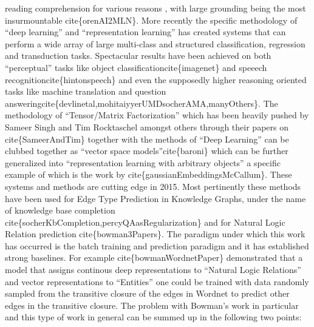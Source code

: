 \documentclass[12pt,answers]{exam} %
\renewcommand{\cite}[1]{cite\{#1\}}
\begin{document}
\begin{questions}
{    reading comprehension for various reasons , with large grounding
    being the most insurmountable \cite{orenAI2MLN}. More recently the
    specific methodology of ``deep learning'' and ``representation
    learning'' has created systems that can perform a wide array of
    large multi-class and structured classification, regression and
    transduction tasks. Spectacular results have been achieved on both
    ``perceptual'' tasks like object classification\cite{imagenet} and
    speeech recognition\cite{hintonspeech} and even the supposedly
    higher reasoning oriented tasks like machine translation and
    question
    answering\cite{devlinetal,mohitaiyyerUMDsocherAMA,manyOthers}. The
    methodology of ``Tensor/Matrix Factorization'' which has been
    heavily pushed by Sameer Singh and Tim Rocktaschel amongst others
    through their papers on \cite{SameerAndTim} together with the
    methods of ``Deep Learning'' can be clubbed together as ``vector
    space models''\cite{baroni} which can be further generalized into
    ``representation learning with arbitrary objects'' a specific
    example of which is the work by \cite{gaussianEmbeddingsMcCallum}.
    These systems and methods are cutting edge in 2015. Most
    pertinently these methods have been used for Edge Type Prediction
    in Knowledge Graphs, under the name of knowledge base completion
    \cite{socherKbCompletion,percyQAasRegularization} and for Natural
    Logic Relation prediction \cite{bowman3Papers}. The paradigm under
    which this work has occurred is the batch training and prediction
    paradigm and it has established strong baselines. For example
    \cite{bowmanWordnetPaper} demonstrated that a model that assigns
    continous deep representations to ``Natural Logic Relations'' and
    vector representations to ``Entities'' one could be trained with
    data randomly sampled from the transitive closure of the edges in
    Wordnet to predict other edges in the transitive closure. The
    problem with Bowman's work in particular and this type of work in
    general can be summed up in the following two points:

}
\end{questions}
\end{document}
